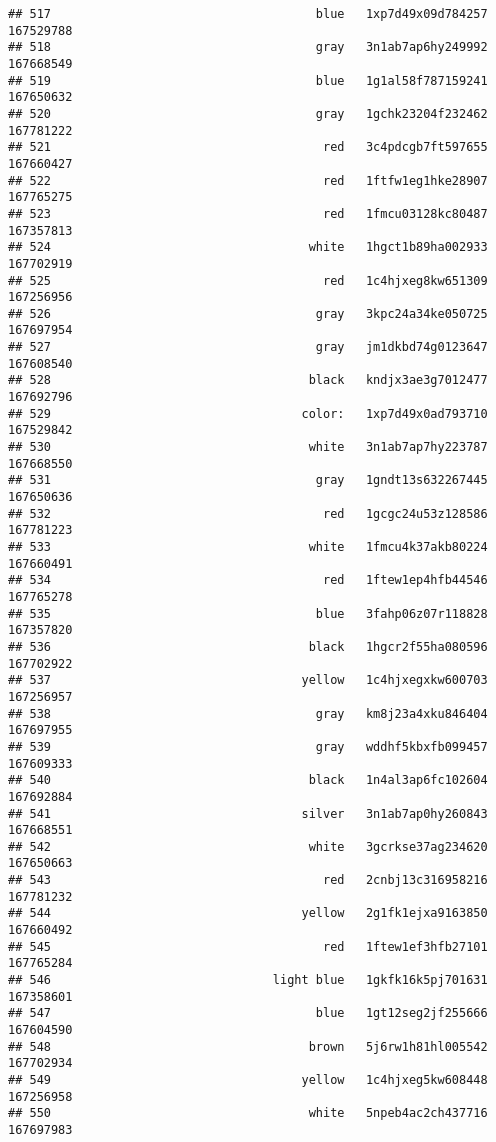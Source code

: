 \documentclass[
]{article}
\begin{document}
\begin{verbatim}
## 517                                     blue   1xp7d49x09d784257 167529788
## 518                                     gray   3n1ab7ap6hy249992 167668549
## 519                                     blue   1g1al58f787159241 167650632
## 520                                     gray   1gchk23204f232462 167781222
## 521                                      red   3c4pdcgb7ft597655 167660427
## 522                                      red   1ftfw1eg1hke28907 167765275
## 523                                      red   1fmcu03128kc80487 167357813
## 524                                    white   1hgct1b89ha002933 167702919
## 525                                      red   1c4hjxeg8kw651309 167256956
## 526                                     gray   3kpc24a34ke050725 167697954
## 527                                     gray   jm1dkbd74g0123647 167608540
## 528                                    black   kndjx3ae3g7012477 167692796
## 529                                   color:   1xp7d49x0ad793710 167529842
## 530                                    white   3n1ab7ap7hy223787 167668550
## 531                                     gray   1gndt13s632267445 167650636
## 532                                      red   1gcgc24u53z128586 167781223
## 533                                    white   1fmcu4k37akb80224 167660491
## 534                                      red   1ftew1ep4hfb44546 167765278
## 535                                     blue   3fahp06z07r118828 167357820
## 536                                    black   1hgcr2f55ha080596 167702922
## 537                                   yellow   1c4hjxegxkw600703 167256957
## 538                                     gray   km8j23a4xku846404 167697955
## 539                                     gray   wddhf5kbxfb099457 167609333
## 540                                    black   1n4al3ap6fc102604 167692884
## 541                                   silver   3n1ab7ap0hy260843 167668551
## 542                                    white   3gcrkse37ag234620 167650663
## 543                                      red   2cnbj13c316958216 167781232
## 544                                   yellow   2g1fk1ejxa9163850 167660492
## 545                                      red   1ftew1ef3hfb27101 167765284
## 546                               light blue   1gkfk16k5pj701631 167358601
## 547                                     blue   1gt12seg2jf255666 167604590
## 548                                    brown   5j6rw1h81hl005542 167702934
## 549                                   yellow   1c4hjxeg5kw608448 167256958
## 550                                    white   5npeb4ac2ch437716 167697983

\end{verbatim}
\end{document}
